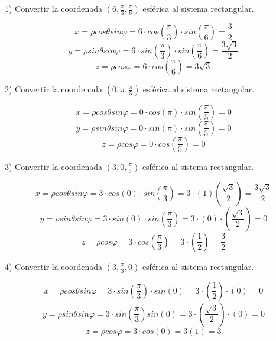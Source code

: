 1) Convertir la coordenada $(6,\frac{\pi}{3},\frac{\pi}{6})$ esférica al sistema rectangular.

\[x = \rho cos \theta sin \varphi = 6 \cdot cos \left(\frac{\pi}{3}\right) \cdot sin \left( \frac{\pi}{6} \right) = \frac{3}{2}\]
\[y = \rho sin \theta sin \varphi = 6 \cdot sin \left( \frac{\pi}{3} \right) \cdot sin \left(\frac{\pi}{6} \right) =\frac{3\sqrt{3}}{2}\]
\[z = \rho cos \varphi = 6 \cdot cos \left(\frac{\pi}{6} \right) = 3 \sqrt{3}\]

\vspace{4mm}
2) Convertir la coordenada $(0, \pi , \frac{\pi}{5})$ esférica al sistema rectangular.

\[x = \rho cos \theta sin \varphi = 0 \cdot cos (\pi) \cdot sin \left(\frac{\pi}{5}\right) = 0\]
\[y = \rho sin \theta sin \varphi = 0 \cdot sin \left(\pi \right) \cdot sin \left(\frac{\pi}{5} \right) = 0\]
\[z = \rho cos \varphi = 0 \cdot cos \left(\frac{\pi}{5} \right) = 0\]

\vspace{4mm}
3) Convertir la coordenada $\left( 3, 0, \frac{\pi}{3} \right)$ esférica al sistema rectangular.

\[x = \rho cos \theta sin \varphi = 3 \cdot cos\left( 0\right) \cdot sin \left(\frac{\pi}{3}\right) = 3 \cdot (1) \left(\frac{\sqrt{3}}{2} \right) = \frac{3\sqrt{3}}{2}\]
\[y = \rho sin \theta sin \varphi = 3 \cdot sin(0) \cdot sin \left( \frac{\pi}{3} \right) = 3 \cdot (0) \cdot \left(\frac{\sqrt{3}}{2}\right) = 0  \]
\[z = \rho cos \varphi = 3 \cdot cos \left( \frac{\pi}{3}\right) = 3 \cdot \left(\frac{1}{2}\right) =\frac{3}{2}\]

\vspace{4mm}
4) Convertir la coordenada $\left(3, \frac{\pi}{3},0\right)$ esférica al sistema rectangular.

\[x = \rho cos \theta sin \varphi = 3 \cdot sin \left(\frac{\pi}{3}\right) \cdot sin (0) =  3 \cdot \left(\frac{1}{2}\right) \cdot (0) = 0 \]
\[y = \rho sin \theta sin \varphi = 3 \cdot sin \left(\frac{\pi}{3}\right) sin (0) = 3 \cdot \left(\frac{\sqrt{3}}{2}\right) \cdot (0) = 0\]
\[z = \rho cos \varphi = 3 \cdot cos(0) = 3(1) = 3
 \]
